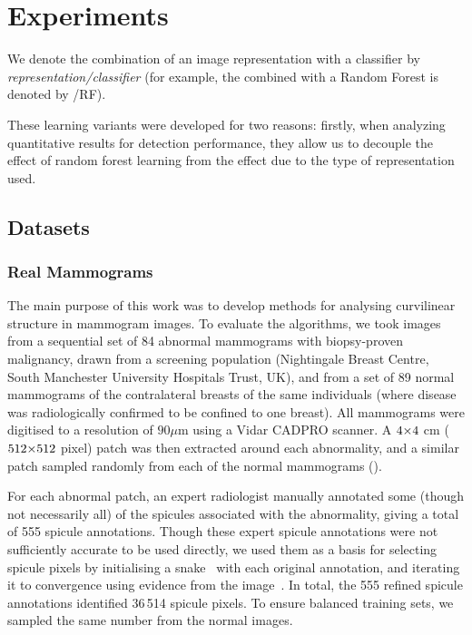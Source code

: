 \chapter{Experiments}
We denote the combination of an image representation with a classifier by \emph{representation/classifier} (for example, the \dtcwt{} combined with a Random Forest is denoted by \dtcwt{}/RF).

These learning variants were developed for two reasons: firstly, when analyzing quantitative results for detection performance, they allow us to decouple the effect of random forest learning from the effect due to the type of representation used. 


\section{Datasets}
\subsection{Real Mammograms}
The main purpose of this work was to develop methods for analysing curvilinear structure in mammogram images. To evaluate the algorithms, we took images from a sequential set of 84 abnormal mammograms with biopsy-proven malignancy, drawn from a screening population (Nightingale Breast Centre, South Manchester University Hospitals Trust, UK), and from a set of 89 normal mammograms of the contralateral breasts of the same individuals (where disease was radiologically confirmed to be confined to one breast). All mammograms were digitised to a resolution of $90 \mu\text{m}$ using a Vidar CADPRO scanner. A $4 {\times} 4$ cm ($512 {\times} 512$ pixel) patch was then extracted around each abnormality, and a similar patch sampled randomly from each of the normal mammograms (). 

For each abnormal patch, an expert radiologist manually annotated some (though not necessarily all) of the spicules associated with the abnormality, giving a total of 555 spicule annotations. Though these expert spicule annotations were not sufficiently accurate to be used directly, we used them as a basis for selecting spicule pixels by initialising a snake~\cite{Kass_etal_IJCV88} with each original annotation, and iterating it to convergence using evidence from the image~\cite{Muralidhar_etal_TMI10}. In total, the 555 refined spicule annotations identified 36\,514 spicule pixels. To ensure balanced training sets, we sampled the same number from the normal images.


